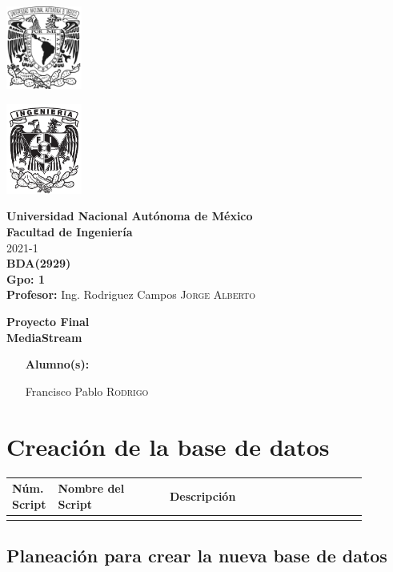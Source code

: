 \documentclass{article}
\def\arraystretch{1}
\newcommand{\coverPage}{
\thispagestyle{empty}
  \begin{minipage}[t][5cm][t]{0.2\linewidth}
    \includegraphics[width=2.5cm]{unam.jpg}

    \vspace{10cm}

    \includegraphics[width=2.5cm]{fiblack}
  \end{minipage}
  \begin{minipage}[t]{0.7\linewidth}
    \vspace{-2.5cm}
    \LARGE{\textbf{\university}}\\
    \Large{\textbf{\faculty}} \\
  
    \large{\semestre}\\[2cm]
  
    \large{\textbf{\materia (\clave)}}\\
    \large{\textbf{Gpo: \grupo}}\\[5mm]
    \large{\textbf{Profesor:} \profesor}\\ [1.5cm]
    \begin{center}
        \LARGE{\textbf{\actividad}}\\
        \LARGE{\textbf{\titulo}}\\
    \end{center}
  
    \vspace{3.3cm}
  
    \large{
      \begin{itemize}[ noitemsep, align=left ]
        \item [\textbf{Alumno(s):}] 
          \begin{flushright}
            \alumno
          \end{flushright}
      \end{itemize}
    } \vspace{1.5cm}
  
    \begin{flushright}
        \fechaEntrega%
    \end{flushright}
  \end{minipage}

\newpage
}
\begin{document}

\newcommand{\university}{Universidad Nacional Autónoma de México}
\newcommand{\faculty}{Facultad de Ingeniería}
\newcommand{\semestre}{2021-1}
\newcommand{\materia}{BDA}
\newcommand{\clave}{2929}
\newcommand{\grupo}{1}
\newcommand{\profesor}{Ing. Rodriguez Campos \textsc{Jorge Alberto}}

\newcommand{\alumno}{
  Francisco Pablo \textsc{Rodrigo} 
}
\newcommand{\actividad}{Proyecto Final}
\newcommand{\titulo}{MediaStream}

\newcommand{\fechaEntrega}{}

\newcommand{\codedir}{scripts}
\graphicspath{{assets/}{bda_proyecto.assets/}{modelo}}

\coverPage%



\section{Creación de la base de datos}

{
  \setlength\tabcolsep{3.5mm}
  \def\arraystretch{2}          %
  \begin{longtable}{
    |C{0.05\linewidth}
    |p{0.3\linewidth}
    |p{0.53\linewidth}|}
  \hline
  \textbf{Núm. Script} &
  \textbf{Nombre del Script} & 
  \textbf{Descripción}
  \\ \hline
    &
  & 
  \\ \hline
  \end{longtable}
}


\subsection{Planeación para crear la nueva base de datos}
\end{document}
